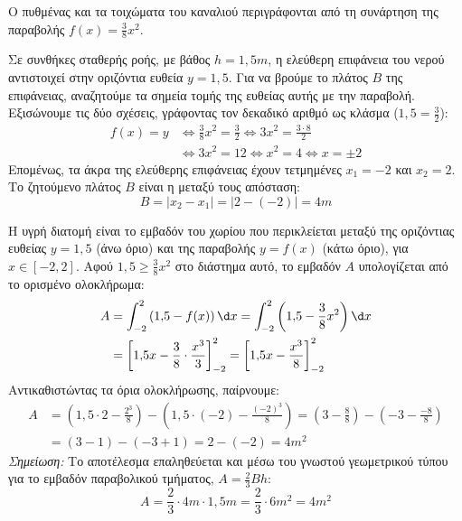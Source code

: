 \begin{center}
\end{center}

\lysh
Ο πυθμένας και τα τοιχώματα του καναλιού περιγράφονται από τη συνάρτηση της παραβολής $f(x)=\frac{3}{8}x^2$. 

\begin{alist}
\item Σε συνθήκες σταθερής ροής, με βάθος $h=1{,}5\si{m}$, η ελεύθερη επιφάνεια του νερού αντιστοιχεί στην οριζόντια ευθεία $y=1{,}5$. Για να βρούμε το πλάτος $B$ της επιφάνειας, αναζητούμε τα σημεία τομής της ευθείας αυτής με την παραβολή. Εξισώνουμε τις δύο σχέσεις, γράφοντας τον δεκαδικό αριθμό ως κλάσμα ($1{,}5 = \frac{3}{2}$):
\begin{align*}
    f(x) = y 
    &\Leftrightarrow \frac{3}{8}x^2 = \frac{3}{2} \Leftrightarrow 3x^2 = \frac{3 \cdot 8}{2} \\
    &\Leftrightarrow 3x^2 = 12 \Leftrightarrow x^2 = 4 \Leftrightarrow x = \pm 2
\end{align*}
Επομένως, τα άκρα της ελεύθερης επιφάνειας έχουν τετμημένες $x_1=-2$ και $x_2=2$. Το ζητούμενο πλάτος $B$ είναι η μεταξύ τους απόσταση:
\[B = |x_2 - x_1| = |2 - (-2)| = 4\si{m}\]

\item Η υγρή διατομή είναι το εμβαδόν του χωρίου που περικλείεται μεταξύ της οριζόντιας ευθείας $y=1{,}5$ (άνω όριο) και της παραβολής $y=f(x)$ (κάτω όριο), για $x \in [-2, 2]$. Αφού $1{,}5 \ge \frac{3}{8}x^2$ στο διάστημα αυτό, το εμβαδόν $A$ υπολογίζεται από το ορισμένο ολοκλήρωμα:
\begin{align*}
    A &= \int_{-2}^{2} \left(1{,}5 - f(x)\right) \d x = \int_{-2}^{2} \left(1{,}5 - \frac{3}{8}x^2\right) \d x \\
      &= \left[ 1{,}5x - \frac{3}{8} \cdot \frac{x^3}{3} \right]_{-2}^{2} = \left[ 1{,}5x - \frac{x^3}{8} \right]_{-2}^{2}
\end{align*}
Αντικαθιστώντας τα όρια ολοκλήρωσης, παίρνουμε:
\begin{align*}
    A &= \left( 1{,}5 \cdot 2 - \frac{2^3}{8} \right) - \left( 1{,}5 \cdot (-2) - \frac{(-2)^3}{8} \right)= \left( 3 - \frac{8}{8} \right) - \left( -3 - \frac{-8}{8} \right) \\
      &= (3 - 1) - (-3 + 1) = 2 - (-2) = 4\si{m^2}
\end{align*}
\emph{Σημείωση:} Το αποτέλεσμα επαληθεύεται και μέσω του γνωστού γεωμετρικού τύπου για το εμβαδόν παραβολικού τμήματος, $A = \frac{2}{3}Bh$:
\[A = \frac{2}{3} \cdot 4\si{m} \cdot 1{,}5\si{m} = \frac{2}{3} \cdot 6\si{m^2} = 4\si{m^2}\]


\end{alist}

